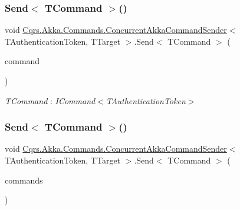 \subsubsection{\texorpdfstring{Send$<$ T\+Command $>$()}{Send< TCommand >()}\hspace{0.1cm}{\footnotesize\ttfamily [1/2]}}
{\footnotesize\ttfamily void \hyperlink{classCqrs_1_1Akka_1_1Commands_1_1ConcurrentAkkaCommandSender}{Cqrs.\+Akka.\+Commands.\+Concurrent\+Akka\+Command\+Sender}$<$ T\+Authentication\+Token, T\+Target $>$.Send$<$ T\+Command $>$ (\begin{DoxyParamCaption}\item[{T\+Command}]{command }\end{DoxyParamCaption})}

\begin{Desc}
\item[Type Constraints]\begin{description}
\item[{\em T\+Command} : {\em I\+Command$<$T\+Authentication\+Token$>$}]\end{description}
\end{Desc}
\mbox{\label{classCqrs_1_1Akka_1_1Commands_1_1ConcurrentAkkaCommandSender_a263a720c8c865bc246756307c0004aa6_a263a720c8c865bc246756307c0004aa6}} 
\subsubsection{\texorpdfstring{Send$<$ T\+Command $>$()}{Send< TCommand >()}\hspace{0.1cm}{\footnotesize\ttfamily [2/2]}}
{\footnotesize\ttfamily void \hyperlink{classCqrs_1_1Akka_1_1Commands_1_1ConcurrentAkkaCommandSender}{Cqrs.\+Akka.\+Commands.\+Concurrent\+Akka\+Command\+Sender}$<$ T\+Authentication\+Token, T\+Target $>$.Send$<$ T\+Command $>$ (\begin{DoxyParamCaption}\item[{I\+Enumerable$<$ T\+Command $>$}]{commands }\end{DoxyParamCaption})}

